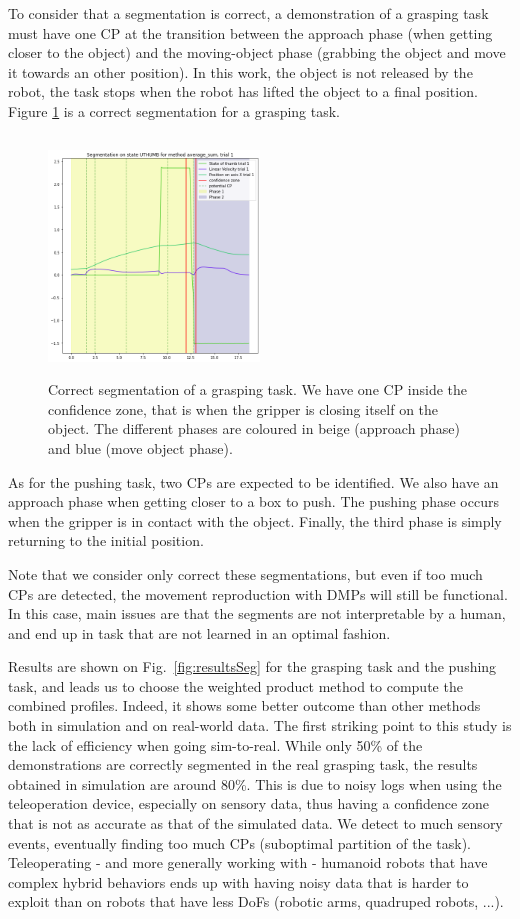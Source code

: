 \documentclass[conference]{IEEEtran}
\begin{document}
To consider that a segmentation is correct, a demonstration of a grasping task must have one CP at the transition between the approach phase (when getting closer to the object) and the moving-object phase (grabbing the object and move it towards an other position). In this work, the object is not released by the robot, the task stops when the robot has lifted the object to a final position. Figure \ref{fig:coloredseg} is a correct segmentation for a grasping task.

\begin{figure}[ht]
  \centering
  \includegraphics[width=0.5\textwidth,height=2.5in]{img/resolSeg.png}
  \caption{Correct segmentation of a grasping task. We have one CP inside the confidence zone, that is when the gripper is closing itself on the object. The different phases are coloured in beige (approach phase) and blue (move object phase).}
  \label{fig:coloredseg}
\end{figure}

As for the pushing task, two CPs are expected to be identified. We also have an approach phase when getting closer to a box to push. The pushing phase occurs when the gripper is in contact with the object. Finally, the third phase is simply returning to the initial position.

Note that we consider only correct these segmentations, but even if too much CPs are detected, the movement reproduction with DMPs will still be functional. In this case, main issues are that the segments are not interpretable by a human, and end up in task that are not learned in an optimal fashion.


Results are shown on Fig.~\ref{fig:resultsSeg} for the grasping task and the pushing task, and leads us to choose the weighted product method to compute the combined profiles. Indeed, it shows some better outcome than other methods both in simulation and on real-world data. The first striking point to this study is the lack of efficiency when going sim-to-real. While only 50\% of the demonstrations are correctly segmented in the real grasping task, the results obtained in simulation are around 80\%. This is due to noisy logs when using the teleoperation device, especially on sensory data, thus having a confidence zone that is not as accurate as that of the simulated data. We detect to much sensory events, eventually finding too much CPs (suboptimal partition of the task). Teleoperating - and more generally working with - humanoid robots that have complex hybrid behaviors ends up with having noisy data that is harder to exploit than on robots that have less DoFs (robotic arms, quadruped robots, ...).
\end{document}
